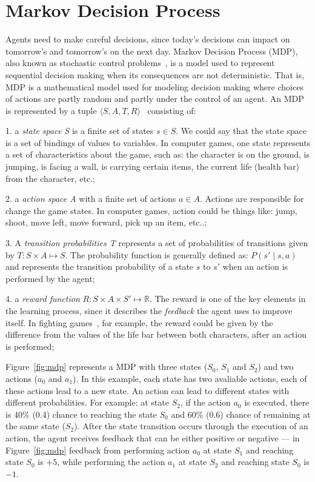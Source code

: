 \section{Markov Decision Process}
\label{sec:markov}

Agents need to make careful decisions, since today's decisions can impact on tomorrow's and tomorrow's on the next day.
Markov Decision Process (MDP), also known as stochastic control problems~\cite{puterman1994markov}, is a model used to represent sequential decision making when its consequences are not deterministic.
That is, MDP is a mathematical model used for modeling decision making where choices of actions are partly random and partly under the control of an agent.
An MDP is represented by a tuple $\langle S, A, T, R\rangle$~\cite{graepel2004learningfight, taylor2011teachingmario} consisting of:

1. a \textit{state space S} is a finite set of states $s \in S$.
We could say that the state space is a set of bindings of values to variables.
In computer games, one state represents a set of characteristics about the game, such as:
the character is on the ground, is jumping, is facing a wall, is carrying certain items, the current life (health bar) from the character, etc.;

2. a \textit{action space A} with a finite set of actions $a \in A$.
Actions are responsible for change the game states. In computer games, action could be things like:
jump, shoot, move left, move forward, pick up an item, etc..;

3. A \textit{transition probabilities T} represents a set of probabilities of transitions given by
$T : S \times A \mapsto S$. The probability function is generally defined as:
$P(s' \mid s,a)$ and represents the transition probability of a state $s$ to $s'$ when
an action is performed by the agent;

4. a \textit{reward function} $R : S \times A \times S' \mapsto \mathbb{R}$.
The reward is one of the key elements in the learning process, since it describes
the \textit{feedback} the agent uses to improve itself.
In fighting games~\cite{graepel2004learningfight}, for example, the reward could be given
by the difference from the values of the life bar between both characters, after an action is performed;

Figure~\ref{fig:mdp} represents a MDP with three states ($S_0$, $S_1$ and $S_2$) and
two actions ($a_0$ and $a_1$). In this example, each state has two avaliable actions,
each of these actions lead to a new state. An action can lead to different states with different probabilities.
For example: at state $S_2$, if the action $a_0$ is executed, there is 40\% (0.4) chance to
reaching the state $S_0$ and 60\% (0.6) chance of remaining at the same state ($S_2$).
After the state transition occurs through the execution of an action, the agent receives feedback that can be
either positive or negative --- in Figure~\ref{fig:mdp} feedback from performing action $a_0$ at state $S_1$
and reaching state $S_0$ is $+5$, while performing the action $a_1$ at state $S_2$ and reaching state $S_0$
is $-1$.

